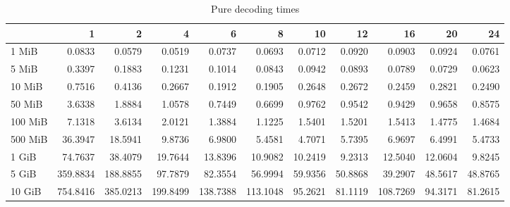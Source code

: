 \begin{table}[!h]
	\caption{Pure decoding times}
	\begin{tabular}{lrrrrrrrrrr}
		\toprule
		\diagbox{File sizes }{Threads} &        1  &        2  &        4  &        6  &        8  &       10 &       12 &        16 &       20 &       24 \\
		\midrule
		1 MiB   &    0.0833 &    0.0579 &    0.0519 &    0.0737 &    0.0693 &   0.0712 &   0.0920 &    0.0903 &   0.0924 &   0.0761 \\
		5 MiB   &    0.3397 &    0.1883 &    0.1231 &    0.1014 &    0.0843 &   0.0942 &   0.0893 &    0.0789 &   0.0729 &   0.0623 \\
		10 MiB  &    0.7516 &    0.4136 &    0.2667 &    0.1912 &    0.1905 &   0.2648 &   0.2672 &    0.2459 &   0.2821 &   0.2490 \\
		50 MiB  &    3.6338 &    1.8884 &    1.0578 &    0.7449 &    0.6699 &   0.9762 &   0.9542 &    0.9429 &   0.9658 &   0.8575 \\
		100 MiB &    7.1318 &    3.6134 &    2.0121 &    1.3884 &    1.1225 &   1.5401 &   1.5201 &    1.5413 &   1.4775 &   1.4684 \\
		500 MiB &   36.3947 &   18.5941 &    9.8736 &    6.9800 &    5.4581 &   4.7071 &   5.7395 &    6.9697 &   6.4991 &   5.4733 \\
		1 GiB   &   74.7637 &   38.4079 &   19.7644 &   13.8396 &   10.9082 &  10.2419 &   9.2313 &   12.5040 &  12.0604 &   9.8245 \\
		5 GiB   &  359.8834 &  188.8855 &   97.7879 &   82.3554 &   56.9994 &  59.9356 &  50.8868 &   39.2907 &  48.5617 &  48.8765 \\
		10 GiB  &  754.8416 &  385.0213 &  199.8499 &  138.7388 &  113.1048 &  95.2621 &  81.1119 &  108.7269 &  94.3171 &  81.2615 \\
		\bottomrule
	\end{tabular}
\end{table}

